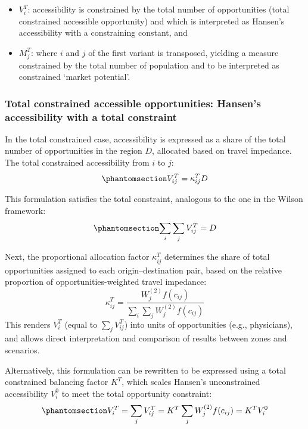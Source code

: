 \documentclass[
  10pt,
  letterpaper,
]{article}
\providecommand{\tightlist}{%
  \setlength{\itemsep}{0pt}\setlength{\parskip}{0pt}}\usepackage{longtable,booktabs,array}
\begin{document}
\begin{itemize}
\tightlist
\item
  \(V_i^T\): accessibility is constrained by the total number of
  opportunities (total constrained accessible opportunity) and which is
  interpreted as Hansen's accessibility with a constraining constant,
  and
\item
  \(M_j^T\): where \(i\) and \(j\) of the first variant is transposed,
  yielding a measure constrained by the total number of population and
  to be interpreted as constrained `market potential'.
\end{itemize}

\subsubsection{Total constrained accessible opportunities: Hansen's
accessibility with a total
constraint}\label{total-constrained-accessible-opportunities-hansens-accessibility-with-a-total-constraint}

In the total constrained case, accessibility is expressed as a share of
the total number of opportunities in the region \(D\), allocated based
on travel impedance. The total constrained accessibility from \(i\) to
\(j\):
\begin{equation}\phantomsection\label{eq-total-constrained-access}{
V^T_{ij} = \kappa_{ij}^T D
}\end{equation}

This formulation satisfies the total constraint, analogous to the one in
the Wilson framework:
\begin{equation}\phantomsection\label{eq-total-constraint-D}{
\sum_i \sum_j V^T_{ij} =  D
}\end{equation}

Next, the proportional allocation factor \(\kappa_{ij}^T\) determines
the share of total opportunities assigned to each origin--destination
pair, based on the relative proportion of opportunities-weighted travel
impedance: \[
\kappa_{ij}^T = \frac{W^{(2)}_j f(c_{ij})}{\sum_i\sum_j W^{(2)}_jf(c_{ij})}
\] This renders \(V_i^T\) (equal to \(\sum_jV_{ij}^T\)) into units of
opportunities (e.g., physicians), and allows direct interpretation and
comparison of results between zones and scenarios.

Alternatively, this formulation can be rewritten to be expressed using a
total constrained balancing factor \(K^T\), which scales Hansen's
unconstrained accessibility \(V_i^0\) to meet the total opportunity
constraint:
\begin{equation}\phantomsection\label{eq-total-constrained-accessibility}{
V^T_i = \sum_j V^T_{ij} = K^T \sum_j W^{(2)}_jf(c_{ij}) = K^T  V^0_i
}\end{equation}
\end{document}
